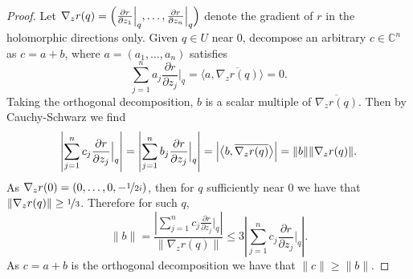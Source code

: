 \documentclass[12pt,openany]{book}
\newcommand{\blinnprod}[2]{\bigl\langle #1 , #2 \bigr\rangle}
\newcommand{\snorm}[1]{\lVert {#1} \rVert}
\newcommand{\Babs}[1]{\Bigl\lvert {#1} \Bigr\rvert}
\newcommand{\abs}[1]{\left\lvert {#1} \right\rvert}
\newcommand{\C}{{\mathbb{C}}}
\theoremstyle{plain}
\theoremstyle{remark}
\theoremstyle{definition}
\theoremstyle{exercise}
\theoremstyle{example}
\begin{document}
\begin{proof}
Let $\nabla_z r(q) =
\Bigl(
\frac{\partial r}{\partial z_1}\Big|_q,\ldots,
\frac{\partial r}{\partial z_n}\Big|_q \Bigr)$ denote the gradient of $r$ in
the holomorphic directions only.
Given $q \in U$ near $0$,
decompose an arbitrary $c \in \C^n$ as $c = a+b$, where $a = (a_1,\ldots,a_n)$
satisfies
\begin{equation*}
\sum_{j=1}^n
a_j \frac{\partial r}{\partial z_j} \Big|_q = 
\blinnprod{a}{\overline{\nabla_z r(q)}}
=
0 .
\end{equation*}
Taking the orthogonal decomposition, $b$ is a scalar multiple of $\overline{\nabla_z r(q)}$.
Then by Cauchy-Schwarz we find
\begin{equation*}
\abs{\sum_{j=1}^n c_j \frac{\partial r}{\partial z_j} \Big|_q}
=
\abs{\sum_{j=1}^n b_j \frac{\partial r}{\partial z_j} \Big|_q}
=
\Babs{\blinnprod{b}{\overline{\nabla_z r(q)}}}
=
\snorm{b} \snorm {\nabla_z r(q)} .
\end{equation*}
As $\nabla_z r(0) = (0,\ldots,0,-\nicefrac{1}{2i})$, then for $q$ sufficiently near $0$ we have that
$\snorm{\nabla_z r(q)} \geq \nicefrac{1}{3}$.  Therefore for such $q$,
\begin{equation*}
\snorm{b} =
\frac{\abs{\sum_{j=1}^n c_j \frac{\partial r}{\partial z_j} \Big|_q}}{\snorm {\nabla_z r(q)}}
\leq
3 \abs{\sum_{j=1}^n c_j \frac{\partial r}{\partial z_j} \Big|_q}
.
\end{equation*}
As $c = a+b$ is the orthogonal decomposition we have that $\snorm{c} \geq
\snorm{b}$.


\end{proof}
\end{document}
